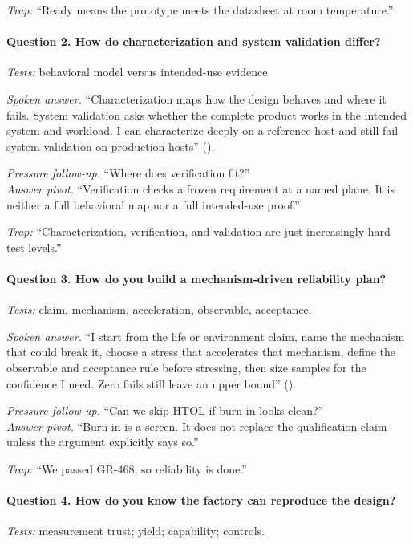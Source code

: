 \textit{Trap:} ``Ready means the prototype meets the datasheet at room
temperature.''

\paragraph{Question 2. How do characterization and system validation differ?}
\textit{Tests:} behavioral model versus intended-use evidence.

\textit{Spoken answer.}
``Characterization maps how the design behaves and where it fails.
System validation asks whether the complete product works in the intended
system and workload. I can characterize deeply on a reference host and still
fail system validation on production hosts''
().

\textit{Pressure follow-up.} ``Where does verification fit?''\\
\textit{Answer pivot.} ``Verification checks a frozen requirement at a named
plane. It is neither a full behavioral map nor a full intended-use proof.''

\textit{Trap:} ``Characterization, verification, and validation are just
increasingly hard test levels.''

\paragraph{Question 3. How do you build a mechanism-driven reliability plan?}
\textit{Tests:} claim, mechanism, acceleration, observable, acceptance.

\textit{Spoken answer.}
``I start from the life or environment claim, name the mechanism that could
break it, choose a stress that accelerates that mechanism, define the
observable and acceptance rule before stressing, then size samples for the
confidence I need. Zero fails still leave an upper bound''
().

\textit{Pressure follow-up.} ``Can we skip HTOL if burn-in looks clean?''\\
\textit{Answer pivot.} ``Burn-in is a screen. It does not replace the
qualification claim unless the argument explicitly says so.''

\textit{Trap:} ``We passed GR-468, so reliability is done.''

\paragraph{Question 4. How do you know the factory can reproduce the design?}
\textit{Tests:} measurement trust; yield; capability; controls.

